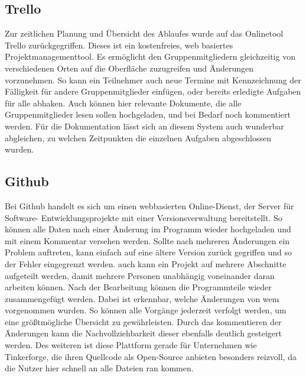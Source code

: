 
\subsection{Trello}
Zur zeitlichen Planung und Übersicht des Ablaufes wurde auf das Onlinetool Trello zurückgegriffen. Dieses ist ein kostenfreies, web basiertes Projektmanagementtool. Es ermöglicht den Gruppenmitgliedern gleichzeitig von verschiedenen Orten auf die Oberfläche zuzugreifen und Änderungen vorzunehmen. So kann ein Teilnehmer auch neue Termine mit Kennzeichnung der Fälligkeit für andere Gruppenmitglieder einfügen, oder bereits erledigte Aufgaben für alle abhaken. Auch können hier relevante Dokumente, die alle Gruppenmitglieder lesen sollen hochgeladen, und bei Bedarf noch kommentiert werden. Für die Dokumentation lässt sich an diesem System auch wunderbar abgleichen, zu welchen Zeitpunkten die einzelnen Aufgaben abgeschlossen wurden.

\subsection{Github}
Bei Github handelt es sich um einen webbasierten Online-Dienst, der Server für Software- Entwicklungsprojekte mit einer Versionsverwaltung bereitstellt. So können alle Daten nach einer Änderung im Programm wieder hochgeladen und mit einem Kommentar versehen werden. Sollte nach mehreren Änderungen ein Problem auftreten, kann einfach auf eine ältere Version zurück gegriffen und so der Fehler eingegrenzt werden. auch kann ein Projekt auf mehrere Abschnitte aufgeteilt werden, damit mehrere Personen unabhängig voneinander daran arbeiten können. Nach der Bearbeitung können die Programmteile wieder zusammengefügt werden. Dabei ist erkennbar, welche Änderungen von wem vorgenommen wurden. So können alle Vorgänge jederzeit verfolgt werden, um eine größtmögliche Übersicht zu gewährleisten. Durch das kommentieren der Änderungen kann die Nachvollziehbarkeit dieser ebenfalls deutlich gesteigert werden. Des weiteren ist diese Plattform gerade für Unternehmen wie Tinkerforge, die ihren Quellcode als Open-Source anbieten besonders reizvoll, da die Nutzer hier schnell an alle Dateien ran kommen.